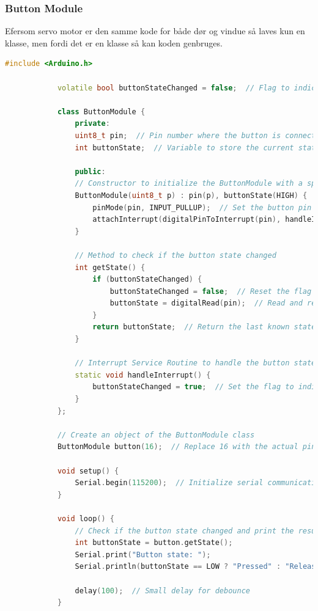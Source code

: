 \documentclass[12pt,a4paper]{book}
\begin{document}
		\subsubsection*{Button Module}
		Efersom servo motor er den samme kode for både dør og vindue så laves kun en klasse, men fordi det er en klasse så kan koden genbruges.
		\begin{lstlisting}[language=C++]
			#include <Arduino.h>
			
			volatile bool buttonStateChanged = false;  // Flag to indicate button state change
			
			class ButtonModule {
				private:
				uint8_t pin;  // Pin number where the button is connected
				int buttonState;  // Variable to store the current state of the button
				
				public:
				// Constructor to initialize the ButtonModule with a specific pin
				ButtonModule(uint8_t p) : pin(p), buttonState(HIGH) {
					pinMode(pin, INPUT_PULLUP);  // Set the button pin as input with internal pull-up
					attachInterrupt(digitalPinToInterrupt(pin), handleInterrupt, CHANGE);  // Attach interrupt to handle button state change
				}
				
				// Method to check if the button state changed
				int getState() {
					if (buttonStateChanged) {
						buttonStateChanged = false;  // Reset the flag after reading
						buttonState = digitalRead(pin);  // Read and return the current state of the button
					}
					return buttonState;  // Return the last known state if no change
				}
				
				// Interrupt Service Routine to handle the button state change
				static void handleInterrupt() {
					buttonStateChanged = true;  // Set the flag to indicate button state change
				}
			};
			
			// Create an object of the ButtonModule class
			ButtonModule button(16);  // Replace 16 with the actual pin number if necessary
			
			void setup() {
				Serial.begin(115200);  // Initialize serial communication at 115200 baud rate
			}
			
			void loop() {
				// Check if the button state changed and print the result
				int buttonState = button.getState();
				Serial.print("Button state: ");
				Serial.println(buttonState == LOW ? "Pressed" : "Released");
				
				delay(100);  // Small delay for debounce
			}
		\end{lstlisting}
		\clearpage
\end{document}
